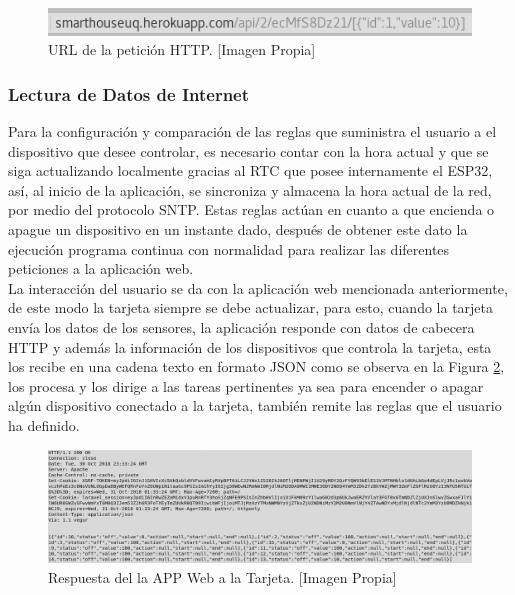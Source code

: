 \begin{figure}[H]
	\centering
	\caption[URL de la petición HTTP.]{URL de la petición HTTP. [Imagen Propia]}
	\label{fig:json}
	\includegraphics[width=0.7\linewidth]{Imagenes/JSON}
\end{figure}


\subsubsection{Lectura de Datos de Internet}

Para la configuración y comparación de las reglas que suministra el usuario a el dispositivo que desee controlar, es necesario contar con la hora actual y que se siga actualizando localmente gracias al RTC que posee internamente el ESP32, así, al inicio de la aplicación, se sincroniza y almacena la hora actual de la red, por medio del protocolo SNTP. Estas reglas actúan en cuanto a que encienda o apague un dispositivo en un instante dado, después de obtener este dato la ejecución programa continua con normalidad para realizar las diferentes peticiones a la aplicación web.\\

La interacción del usuario se da con la aplicación web mencionada anteriormente, de este modo la tarjeta siempre se debe actualizar, para esto, cuando la tarjeta envía los datos de los sensores, la aplicación responde con datos de cabecera HTTP y además la información de los dispositivos que controla la tarjeta, esta los recibe en una cadena texto en formato JSON como se observa en la Figura \ref{fig:httprqstesp}, los procesa y los dirige a las tareas pertinentes ya sea para encender o apagar algún dispositivo conectado a la tarjeta, también remite las reglas que el usuario ha definido.\\

\begin{figure}[H]
	\centering
	\caption[Respuesta del la APP Web a la Tarjeta.]{Respuesta del la APP Web a la Tarjeta.  [Imagen Propia]}
	\label{fig:httprqstesp}
	\includegraphics[width=0.8\linewidth]{Imagenes/HTTPRqstesp}
\end{figure}

